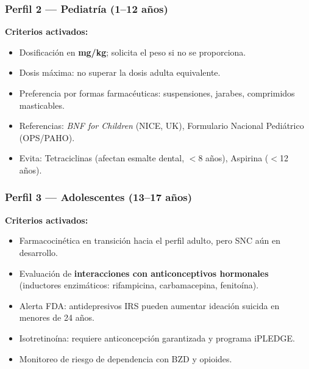 \documentclass[12pt,a4paper]{article}
\begin{document}
\subsubsection{Perfil 2 --- Pediatría (1--12 años)}

\begin{tcolorbox}[colback=pediatrico!5, colframe=pediatrico, title=\textbf{Pediatría --- 1-12 años}]
  \textbf{Criterios activados:}
  \begin{itemize}
    \item Dosificación en \textbf{mg/kg}; solicita el peso si no se proporciona.
    \item Dosis máxima: no superar la dosis adulta equivalente.
    \item Preferencia por formas farmacéuticas: suspensiones, jarabes, comprimidos masticables.
    \item Referencias: \textit{BNF for Children} (NICE, UK), Formulario Nacional Pediátrico
      (OPS/PAHO).
    \item Evita: Tetraciclinas (afectan esmalte dental, $<$8 años), Aspirina ($<$12 años).
  \end{itemize}
\end{tcolorbox}

\subsubsection{Perfil 3 --- Adolescentes (13--17 años)}

\begin{tcolorbox}[colback=adolescente!5, colframe=adolescente, title=\textbf{Adolescentes --- 13-17 años}]
  \textbf{Criterios activados:}
  \begin{itemize}
    \item Farmacocinética en transición hacia el perfil adulto, pero SNC aún en desarrollo.
    \item Evaluación de \textbf{interacciones con anticonceptivos hormonales} (inductores
      enzimáticos: rifampicina, carbamacepina, fenitoína).
    \item Alerta FDA: antidepresivos IRS pueden aumentar ideación suicida en menores de 24 años.
    \item Isotretinoína: requiere anticoncepción garantizada y programa iPLEDGE.
    \item Monitoreo de riesgo de dependencia con BZD y opioides.
  \end{itemize}
\end{tcolorbox}
\end{document}
